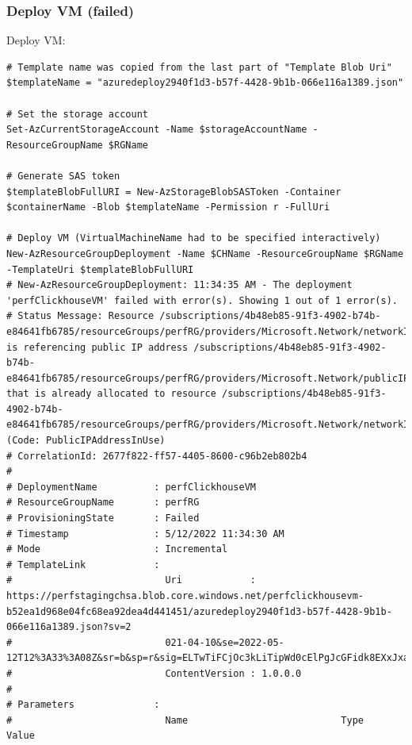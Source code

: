 \subsubsection{Deploy VM (failed)}
\label{sec:org9eacaf3}
Deploy VM:
\begin{verbatim}
# Template name was copied from the last part of "Template Blob Uri"
$templateName = "azuredeploy2940f1d3-b57f-4428-9b1b-066e116a1389.json"

# Set the storage account
Set-AzCurrentStorageAccount -Name $storageAccountName -ResourceGroupName $RGName

# Generate SAS token
$templateBlobFullURI = New-AzStorageBlobSASToken -Container $containerName -Blob $templateName -Permission r -FullUri

# Deploy VM (VirtualMachineName had to be specified interactively)
New-AzResourceGroupDeployment -Name $CHName -ResourceGroupName $RGName -TemplateUri $templateBlobFullURI
# New-AzResourceGroupDeployment: 11:34:35 AM - The deployment 'perfClickhouseVM' failed with error(s). Showing 1 out of 1 error(s).
# Status Message: Resource /subscriptions/4b48eb85-91f3-4902-b74b-e84641fb6785/resourceGroups/perfRG/providers/Microsoft.Network/networkInterfaces/perfClickhouseVMRestoredNIC5324890b7fe44a77ae9def7a461b6e81/ipConfigurations/c0dbf1d5514749ec849957897d9405d1 is referencing public IP address /subscriptions/4b48eb85-91f3-4902-b74b-e84641fb6785/resourceGroups/perfRG/providers/Microsoft.Network/publicIPAddresses/perfClickhouseVMRestoredip that is already allocated to resource /subscriptions/4b48eb85-91f3-4902-b74b-e84641fb6785/resourceGroups/perfRG/providers/Microsoft.Network/networkInterfaces/perfClickhouseVMRestoredNICb9bd95260138425bab106f324a42acbc/ipConfigurations/7ba12bb4efcf444d9f08dd1aff9a1cc6. (Code: PublicIPAddressInUse)
# CorrelationId: 2677f822-ff57-4405-8600-c96b2eb802b4
#
# DeploymentName          : perfClickhouseVM
# ResourceGroupName       : perfRG
# ProvisioningState       : Failed
# Timestamp               : 5/12/2022 11:34:30 AM
# Mode                    : Incremental
# TemplateLink            :
#                           Uri            : https://perfstagingchsa.blob.core.windows.net/perfclickhousevm-b52ea1d968e04fc68ea92dea4d441451/azuredeploy2940f1d3-b57f-4428-9b1b-066e116a1389.json?sv=2
#                           021-04-10&se=2022-05-12T12%3A33%3A08Z&sr=b&sp=r&sig=ELTwTiFCjOc3kLiTipWd0cElPgJcGFidk8EXxJxaYfU%3D
#                           ContentVersion : 1.0.0.0
#
# Parameters              :
#                           Name                           Type                       Value

\end{verbatim}
